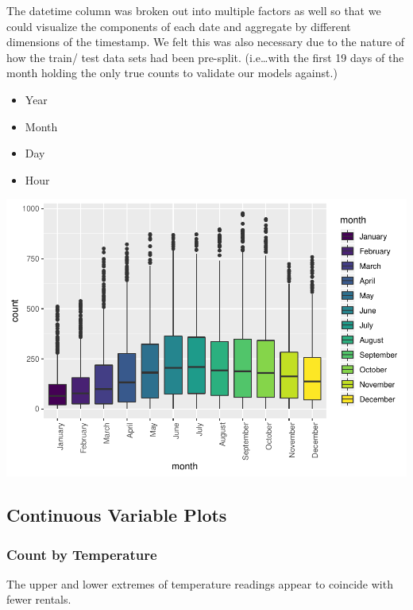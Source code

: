 \documentclass[american,]{article}
\providecommand{\tightlist}{%
  \setlength{\itemsep}{0pt}\setlength{\parskip}{0pt}}
\begin{document}
The datetime column was broken out into multiple factors as well so that we could visualize the components of each date and aggregate by different dimensions of the timestamp. We felt this was also necessary due to the nature of how the train/ test data sets had been pre-split. (i.e\ldots{}with the first 19 days of the month holding the only true counts to validate our models against.)

\begin{itemize}
\tightlist
\item
  Year
\item
  Month
\item
  Day
\item
  Hour
\end{itemize}

\includegraphics{BikeSharingDemand_files/figure-latex/train.mod.1.month-1.pdf}

\newpage

\hypertarget{continuous-variable-plots}{%
\subsection{Continuous Variable Plots}\label{continuous-variable-plots}}

\hypertarget{count-by-temperature}{%
\subsubsection{Count by Temperature}\label{count-by-temperature}}

The upper and lower extremes of temperature readings appear to coincide with fewer rentals.
\end{document}
